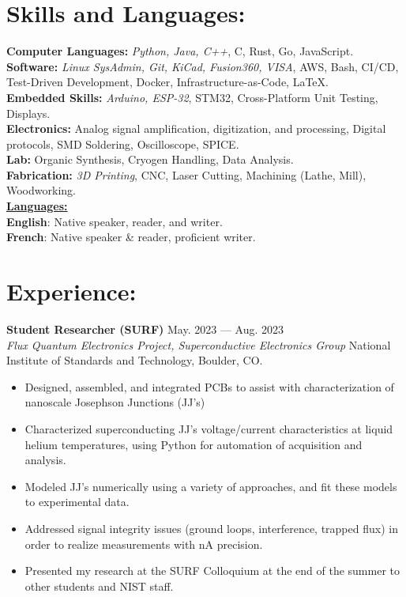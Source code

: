 \documentclass[11pt]{article}
\begin{document}
\section*{Skills and Languages:}
{\bf Computer Languages: }{\em Python, Java, C++}, C, Rust, Go, JavaScript.\\
{\bf Software:} {\em Linux SysAdmin, Git, KiCad, Fusion360, VISA}, AWS, Bash, CI/CD, Test-Driven Development, Docker, Infrastructure-as-Code, \LaTeX.\\
{\bf Embedded Skills:} {\em Arduino, ESP-32}, STM32, Cross-Platform Unit Testing, Displays.\\
{\bf Electronics:} Analog signal amplification, digitization, and processing, Digital protocols, SMD Soldering, Oscilloscope, SPICE. \\
{\bf Lab:} Organic Synthesis, Cryogen Handling, Data Analysis.\\
{\bf Fabrication:} {\em 3D Printing}, CNC, Laser Cutting, Machining (Lathe, Mill), Woodworking. \\

\noindent\textbf{\underline{Languages:}} \\
\textbf{English}: Native speaker, reader, and writer. \\
\textbf{French}: Native speaker \& reader, proficient writer.

\section*{Experience:}

\noindent
{\bf Student Researcher (SURF)} \hfill May. 2023 --- Aug. 2023 \\
{\sl Flux Quantum Electronics Project, Superconductive Electronics Group} National Institute of Standards and Technology, Boulder, CO.
\begin{itemize}[topsep=0pt] \itemsep -4pt
	\item Designed, assembled, and integrated PCBs to assist with characterization of nanoscale Josephson Junctions (JJ's)
	\item Characterized superconducting JJ's voltage/current characteristics at liquid helium temperatures, using Python for automation of acquisition and analysis.
	\item Modeled JJ's numerically using a variety of approaches, and fit these models to experimental data.
	\item Addressed signal integrity issues (ground loops, interference, trapped flux) in order to realize measurements with nA precision.
	\item Presented my research at the SURF Colloquium at the end of the summer to other students and NIST staff.
\end{itemize}
\end{document}
